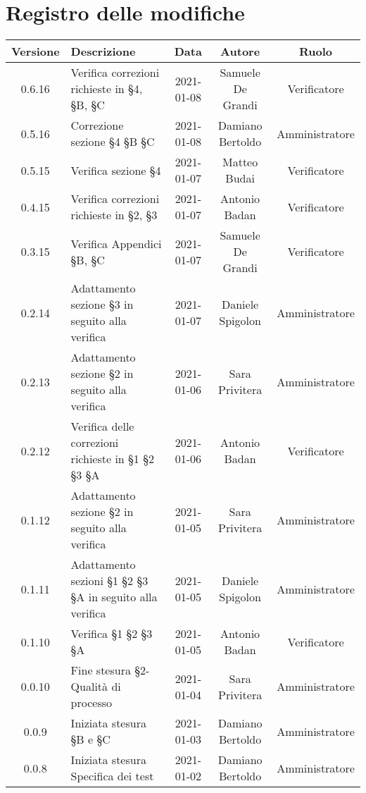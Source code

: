 \section*{Registro delle modifiche}

\begin{center}
	\begin{longtable}{|c|p{5cm}|c|c|c|}
	\hline
	\rowcolor{lighter-grayer}
	\textbf{Versione} & \textbf{Descrizione} & \textbf{Data} & \textbf{Autore} & \textbf{Ruolo} \\
	\hline
	\endfirsthead

	0.6.16 & Verifica correzioni richieste in §4, §B, §C  & 2021-01-08 & Samuele De Grandi & Verificatore \\
	\hline
	0.5.16 & Correzione sezione §4 §B §C  & 2021-01-08 & Damiano Bertoldo & Amministratore \\
	\hline
	0.5.15 & Verifica sezione §4  & 2021-01-07 & Matteo Budai & Verificatore \\
	\hline
	0.4.15 & Verifica correzioni richieste in §2, §3  & 2021-01-07 & Antonio Badan & Verificatore \\
	\hline
	0.3.15 & Verifica Appendici §B, §C  & 2021-01-07 & Samuele De Grandi & Verificatore \\
	\hline
	0.2.14 & Adattamento sezione §3 in seguito alla verifica & 2021-01-07 & Daniele Spigolon & Amministratore \\
	\hline
	0.2.13 & Adattamento sezione §2 in seguito alla verifica & 2021-01-06 & Sara Privitera & Amministratore \\
	\hline
	0.2.12 & Verifica delle correzioni richieste in §1 §2 §3 §A & 2021-01-06 & Antonio Badan & Verificatore \\
	\hline
	0.1.12 & Adattamento sezione §2 in seguito alla verifica & 2021-01-05 & Sara Privitera & Amministratore \\
	\hline
	0.1.11 & Adattamento sezioni §1 §2 §3 §A in seguito alla verifica & 2021-01-05 & Daniele Spigolon & Amministratore \\
	\hline
	0.1.10 & Verifica §1 §2 §3 §A & 2021-01-05 & Antonio Badan & Verificatore \\
	\hline
	0.0.10 & Fine stesura §2-Qualità di processo & 2021-01-04 & Sara Privitera & Amministratore \\
	\hline
	0.0.9 & Iniziata stesura §B e §C & 2021-01-03 & Damiano Bertoldo & Amministratore \\
	\hline
	0.0.8 & Iniziata stesura Specifica dei test & 2021-01-02 & Damiano Bertoldo & Amministratore \\

\end{longtable}
\end{center}
